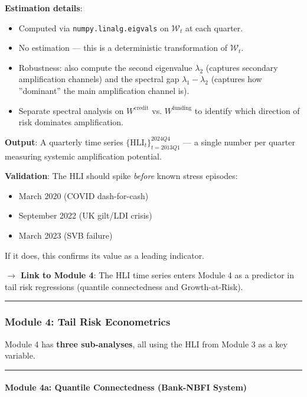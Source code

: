 \documentclass[11pt,a4paper]{article}
\begin{document}
\textbf{Estimation details}:
\begin{itemize}
\item Computed via \texttt{numpy.linalg.eigvals} on $\mathcal{W}_t$ at each quarter.
\item No estimation --- this is a deterministic transformation of $\mathcal{W}_t$.
\item Robustness: also compute the second eigenvalue $\lambda_2$ (captures secondary amplification channels) and the spectral gap $\lambda_1 - \lambda_2$ (captures how ''dominant'' the main amplification channel is).
\item Separate spectral analysis on $W^{\text{credit}}$ vs. $W^{\text{funding}}$ to identify which direction of risk dominates amplification.

\end{itemize}
\textbf{Output}: A quarterly time series $\{\text{HLI}_t\}_{t=2013Q1}^{2024Q4}$ --- a single number per quarter measuring systemic amplification potential.

\textbf{Validation}: The HLI should spike \textit{before} known stress episodes:
\begin{itemize}
\item March 2020 (COVID dash-for-cash)
\item September 2022 (UK gilt/LDI crisis)
\item March 2023 (SVB failure)

\end{itemize}
If it does, this confirms its value as a leading indicator.

\textbf{$\rightarrow$ Link to Module 4}: The HLI time series enters Module 4 as a predictor in tail risk regressions (quantile connectedness and Growth-at-Risk).


\bigskip\noindent\rule{\textwidth}{0.4pt}\bigskip


\subsubsection{Module 4: Tail Risk Econometrics}

Module 4 has \textbf{three sub-analyses}, all using the HLI from Module 3 as a key variable.


\bigskip\noindent\rule{\textwidth}{0.4pt}\bigskip


\paragraph{Module 4a: Quantile Connectedness (Bank-NBFI System)}
\end{document}
